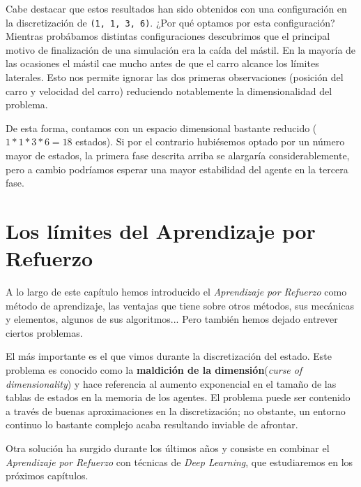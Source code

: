 Cabe destacar que estos resultados han sido obtenidos con una configuración en la discretización de \texttt{(1, 1, 3, 6)}. ¿Por qué optamos por esta configuración? Mientras probábamos distintas configuraciones descubrimos que el principal motivo de finalización de una simulación era la caída del mástil. En la mayoría de las ocasiones el mástil cae mucho antes de que el carro alcance los límites laterales. Esto nos permite ignorar las dos primeras observaciones (posición del carro y velocidad del carro) reduciendo notablemente la dimensionalidad del problema.

De esta forma, contamos con un espacio dimensional bastante reducido ($1*1*3*6=18$ estados). Si por el contrario hubiésemos optado por un número mayor de estados, la primera fase descrita arriba se alargaría considerablemente, pero a cambio podríamos esperar una mayor estabilidad del agente en la tercera fase.

\section{Los límites del Aprendizaje por Refuerzo}
A lo largo de este capítulo hemos introducido el \textit{Aprendizaje por Refuerzo} como método de aprendizaje, las ventajas que tiene sobre otros métodos, sus mecánicas y elementos, algunos de sus algoritmos... Pero también hemos dejado entrever ciertos problemas.

El más importante es el que vimos durante la discretización del estado. Este problema es conocido como la \textbf{maldición de la dimensión}(\textit{curse of dimensionality}) y hace referencia al aumento exponencial en el tamaño de las tablas de estados en la memoria de los agentes. El problema puede ser contenido a través de buenas aproximaciones en la discretización; no obstante, un entorno continuo lo bastante complejo acaba resultando inviable de afrontar.

Otra solución ha surgido durante los últimos años y consiste en combinar el \textit{Aprendizaje por Refuerzo} con técnicas de \textit{Deep Learning}, que estudiaremos en los próximos capítulos.
